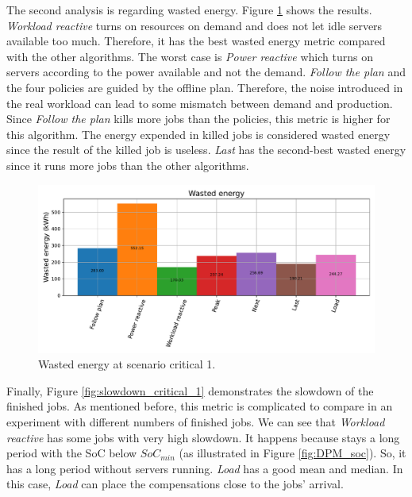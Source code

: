 The second analysis is regarding wasted energy. Figure \ref{fig:energy_critical_1} shows the results. \emph{Workload reactive} turns on resources on demand and does not let idle servers available too much. Therefore, it has the best wasted energy metric compared with the other algorithms. The worst case is \emph{Power reactive} which turns on servers according to the power available and not the demand. \emph{Follow the plan} and the four policies are guided by the offline plan. Therefore, the noise introduced in the real workload can lead to some mismatch between demand and production. Since \emph{Follow the plan} kills more jobs than the policies, this metric is higher for this algorithm. The energy expended in killed jobs is considered wasted energy since the result of the killed job is useless. \emph{Last} has the second-best wasted energy since it runs more jobs than the other algorithms.

\begin{figure}[!htb]
    \centering
    \includegraphics[scale=0.55]{Images/Compensations/energy_critical_1.pdf}
    \caption{Wasted energy at scenario critical 1.}
    \label{fig:energy_critical_1}
\end{figure}

Finally, Figure \ref{fig:slowdown_critical_1} demonstrates the slowdown of the finished jobs. As mentioned before, this metric is complicated to compare in an experiment with different numbers of finished jobs. We can see that \emph{Workload reactive} has some jobs with very high slowdown. It happens because stays a long period with the SoC below $SoC_{min}$ (as illustrated in Figure \ref{fig:DPM_soc}). So, it has a long period without servers running. \emph{Load} has a good mean and median. In this case, \emph{Load} can place the compensations close to the jobs' arrival. 

